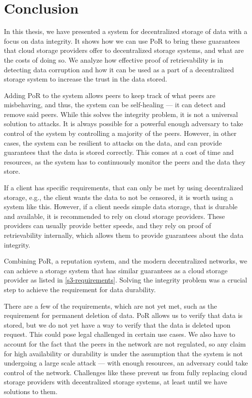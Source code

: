 \chapter{Conclusion}
\label{chapter:conclusion}

In this thesis, we have presented a system for decentralized storage of data
with a focus on data integrity.
It shows how we can use PoR to bring these guarantees that cloud storage providers
offer to decentralized storage systems, and what are the costs of doing so.
We analyze how effective proof of retrievability is in detecting data corruption
and how it can be used as a part of a decentralized storage system
to increase the trust in the data stored.

Adding PoR to the system allows peers to keep track of what peers are misbehaving,
and thus, the system can be self-healing --- it can detect and remove said peers.
While this solves the integrity problem, it is not a universal solution to attacks.
It is always possible for a powerful enough adversary to take control of the system
by controlling a majority of the peers.
However, in other cases, the system can be resilient to attacks on the data,
and can provide guarantees that the data is stored correctly.
This comes at a cost of time and resources, as the system has to continuously
monitor the peers and the data they store.

If a client has specific requirements, that can only be met by using decentralized storage,
e.g., the client wants the data to not be censored, it is worth using a system like this.
However, if a client needs simple data storage, that is durable and available,
it is recommended to rely on cloud storage providers.
These providers can usually provide better speeds, and they rely on proof of retrievability internally,
which allows them to provide guarantees about the data integrity.

Combining PoR, a reputation system, and the modern decentralized networks,
we can achieve a storage system that has similar guarantees as a cloud storage provider
as listed in \autoref{s3-requirements}.
Solving the integrity problem was a crucial step to achieve the requirement for data durability.

There are a few of the requirements, which are not yet met, such as the requirement for
permanent deletion of data.
PoR allows us to verify that data is stored, but we do not yet have a way to verify that
the data is deleted upon request.
This could pose legal challenged in certain use cases.
We also have to account for the fact that the peers in the network are not regulated,
so any claim for high availability or durability is under the assumption that
the system is not undergoing a large scale attack --- with enough resources,
an adversary could take control of the network.
Challenges like these prevent us from fully replacing cloud storage providers
with decentralized storage systems, at least until we have solutions to them.

